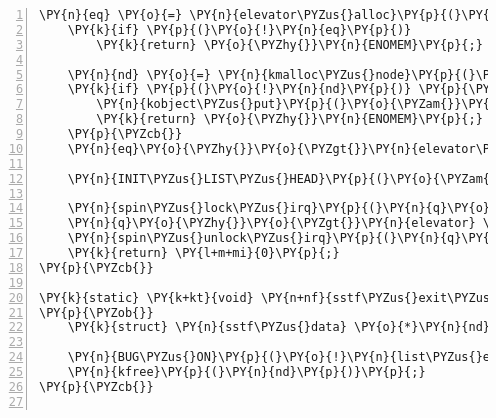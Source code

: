 \begin{Verbatim}[commandchars=\\\{\},numbers=left,firstnumber=1,stepnumber=1]
	\PY{n}{eq} \PY{o}{=} \PY{n}{elevator\PYZus{}alloc}\PY{p}{(}\PY{n}{q}\PY{p}{,} \PY{n}{e}\PY{p}{)}\PY{p}{;}
	\PY{k}{if} \PY{p}{(}\PY{o}{!}\PY{n}{eq}\PY{p}{)}
		\PY{k}{return} \PY{o}{\PYZhy{}}\PY{n}{ENOMEM}\PY{p}{;}

	\PY{n}{nd} \PY{o}{=} \PY{n}{kmalloc\PYZus{}node}\PY{p}{(}\PY{k}{sizeof}\PY{p}{(}\PY{o}{*}\PY{n}{nd}\PY{p}{)}\PY{p}{,} \PY{n}{GFP\PYZus{}KERNEL}\PY{p}{,} \PY{n}{q}\PY{o}{\PYZhy{}}\PY{o}{\PYZgt{}}\PY{n}{node}\PY{p}{)}\PY{p}{;}
	\PY{k}{if} \PY{p}{(}\PY{o}{!}\PY{n}{nd}\PY{p}{)} \PY{p}{\PYZob{}}
		\PY{n}{kobject\PYZus{}put}\PY{p}{(}\PY{o}{\PYZam{}}\PY{n}{eq}\PY{o}{\PYZhy{}}\PY{o}{\PYZgt{}}\PY{n}{kobj}\PY{p}{)}\PY{p}{;}
		\PY{k}{return} \PY{o}{\PYZhy{}}\PY{n}{ENOMEM}\PY{p}{;}
	\PY{p}{\PYZcb{}}
	\PY{n}{eq}\PY{o}{\PYZhy{}}\PY{o}{\PYZgt{}}\PY{n}{elevator\PYZus{}data} \PY{o}{=} \PY{n}{nd}\PY{p}{;}

	\PY{n}{INIT\PYZus{}LIST\PYZus{}HEAD}\PY{p}{(}\PY{o}{\PYZam{}}\PY{n}{nd}\PY{o}{\PYZhy{}}\PY{o}{\PYZgt{}}\PY{n}{queue}\PY{p}{)}\PY{p}{;}

	\PY{n}{spin\PYZus{}lock\PYZus{}irq}\PY{p}{(}\PY{n}{q}\PY{o}{\PYZhy{}}\PY{o}{\PYZgt{}}\PY{n}{queue\PYZus{}lock}\PY{p}{)}\PY{p}{;}
	\PY{n}{q}\PY{o}{\PYZhy{}}\PY{o}{\PYZgt{}}\PY{n}{elevator} \PY{o}{=} \PY{n}{eq}\PY{p}{;}
	\PY{n}{spin\PYZus{}unlock\PYZus{}irq}\PY{p}{(}\PY{n}{q}\PY{o}{\PYZhy{}}\PY{o}{\PYZgt{}}\PY{n}{queue\PYZus{}lock}\PY{p}{)}\PY{p}{;}
	\PY{k}{return} \PY{l+m+mi}{0}\PY{p}{;}
\PY{p}{\PYZcb{}}

\PY{k}{static} \PY{k+kt}{void} \PY{n+nf}{sstf\PYZus{}exit\PYZus{}queue}\PY{p}{(}\PY{k}{struct} \PY{n}{elevator\PYZus{}queue} \PY{o}{*}\PY{n}{e}\PY{p}{)}
\PY{p}{\PYZob{}}
	\PY{k}{struct} \PY{n}{sstf\PYZus{}data} \PY{o}{*}\PY{n}{nd} \PY{o}{=} \PY{n}{e}\PY{o}{\PYZhy{}}\PY{o}{\PYZgt{}}\PY{n}{elevator\PYZus{}data}\PY{p}{;}

	\PY{n}{BUG\PYZus{}ON}\PY{p}{(}\PY{o}{!}\PY{n}{list\PYZus{}empty}\PY{p}{(}\PY{o}{\PYZam{}}\PY{n}{nd}\PY{o}{\PYZhy{}}\PY{o}{\PYZgt{}}\PY{n}{queue}\PY{p}{)}\PY{p}{)}\PY{p}{;}
	\PY{n}{kfree}\PY{p}{(}\PY{n}{nd}\PY{p}{)}\PY{p}{;}
\PY{p}{\PYZcb{}}


\end{Verbatim}
